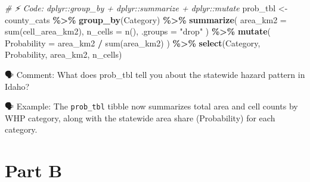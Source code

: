\documentclass[
  12pt,
]{scrreprt}
\newenvironment{Shaded}{\begin{snugshade}}{\end{snugshade}}
\newcommand{\AttributeTok}[1]{\textcolor[rgb]{0.13,0.29,0.53}{#1}}
\newcommand{\CommentTok}[1]{\textcolor[rgb]{0.56,0.35,0.01}{\textit{#1}}}
\newcommand{\FunctionTok}[1]{\textcolor[rgb]{0.13,0.29,0.53}{\textbf{#1}}}
\newcommand{\NormalTok}[1]{#1}
\newcommand{\OtherTok}[1]{\textcolor[rgb]{0.56,0.35,0.01}{#1}}
\newcommand{\SpecialCharTok}[1]{\textcolor[rgb]{0.81,0.36,0.00}{\textbf{#1}}}
\newcommand{\StringTok}[1]{\textcolor[rgb]{0.31,0.60,0.02}{#1}}
\begin{document}
\begin{Shaded}
\begin{Highlighting}[]
\CommentTok{\# ⚡ Code: dplyr::group\_by + dplyr::summarize + dplyr::mutate}
\StringTok{\textasciigrave{}}\AttributeTok{prob\_tbl}\StringTok{\textasciigrave{}} \OtherTok{\textless{}{-}}\NormalTok{ county\_cats }\SpecialCharTok{\%\textgreater{}\%}
  \FunctionTok{group\_by}\NormalTok{(}\StringTok{\textasciigrave{}}\AttributeTok{Category}\StringTok{\textasciigrave{}}\NormalTok{) }\SpecialCharTok{\%\textgreater{}\%}
  \FunctionTok{summarize}\NormalTok{(}
    \AttributeTok{area\_km2 =} \StringTok{\textasciigrave{}}\AttributeTok{sum(cell\_area\_km2)}\StringTok{\textasciigrave{}}\NormalTok{,}
    \AttributeTok{n\_cells  =} \StringTok{\textasciigrave{}}\AttributeTok{n()}\StringTok{\textasciigrave{}}\NormalTok{,}
    \AttributeTok{.groups  =} \StringTok{\textasciigrave{}}\AttributeTok{"drop"}\StringTok{\textasciigrave{}}
\NormalTok{  ) }\SpecialCharTok{\%\textgreater{}\%}
  \FunctionTok{mutate}\NormalTok{(}
    \AttributeTok{Probability =}\NormalTok{ area\_km2 }\SpecialCharTok{/} \StringTok{\textasciigrave{}}\AttributeTok{sum(area\_km2)}\StringTok{\textasciigrave{}}
\NormalTok{  ) }\SpecialCharTok{\%\textgreater{}\%}
  \FunctionTok{select}\NormalTok{(}\StringTok{\textasciigrave{}}\AttributeTok{Category}\StringTok{\textasciigrave{}}\NormalTok{, }\StringTok{\textasciigrave{}}\AttributeTok{Probability}\StringTok{\textasciigrave{}}\NormalTok{, }\StringTok{\textasciigrave{}}\AttributeTok{area\_km2}\StringTok{\textasciigrave{}}\NormalTok{, }\StringTok{\textasciigrave{}}\AttributeTok{n\_cells}\StringTok{\textasciigrave{}}\NormalTok{)}
\end{Highlighting}
\end{Shaded}

\begin{Shaded}
\end{Shaded}

🗣 Comment: What does prob\_tbl tell you about the statewide hazard pattern in Idaho?

🗣 Example: The \texttt{prob\_tbl} tibble now summarizes total area and cell counts by WHP category, along with the statewide area share (Probability) for each category.

\chapter{Part B}\label{part-b}
\end{document}
